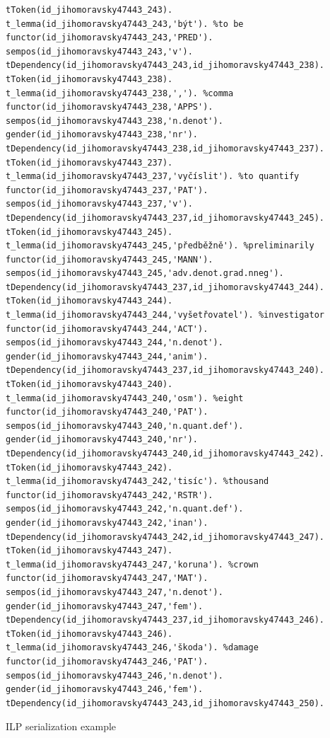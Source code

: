 \begin{listing}[ht]
\begin{verbatim}
tToken(id_jihomoravsky47443_243).
t_lemma(id_jihomoravsky47443_243,'být'). %to be
functor(id_jihomoravsky47443_243,'PRED').
sempos(id_jihomoravsky47443_243,'v').
tDependency(id_jihomoravsky47443_243,id_jihomoravsky47443_238).
tToken(id_jihomoravsky47443_238).
t_lemma(id_jihomoravsky47443_238,','). %comma
functor(id_jihomoravsky47443_238,'APPS').
sempos(id_jihomoravsky47443_238,'n.denot').
gender(id_jihomoravsky47443_238,'nr').
tDependency(id_jihomoravsky47443_238,id_jihomoravsky47443_237).
tToken(id_jihomoravsky47443_237).
t_lemma(id_jihomoravsky47443_237,'vyčíslit'). %to quantify
functor(id_jihomoravsky47443_237,'PAT').
sempos(id_jihomoravsky47443_237,'v').
tDependency(id_jihomoravsky47443_237,id_jihomoravsky47443_245).
tToken(id_jihomoravsky47443_245).
t_lemma(id_jihomoravsky47443_245,'předběžně'). %preliminarily
functor(id_jihomoravsky47443_245,'MANN').
sempos(id_jihomoravsky47443_245,'adv.denot.grad.nneg').
tDependency(id_jihomoravsky47443_237,id_jihomoravsky47443_244).
tToken(id_jihomoravsky47443_244).
t_lemma(id_jihomoravsky47443_244,'vyšetřovatel'). %investigator
functor(id_jihomoravsky47443_244,'ACT').
sempos(id_jihomoravsky47443_244,'n.denot').
gender(id_jihomoravsky47443_244,'anim').
tDependency(id_jihomoravsky47443_237,id_jihomoravsky47443_240).
tToken(id_jihomoravsky47443_240).
t_lemma(id_jihomoravsky47443_240,'osm'). %eight
functor(id_jihomoravsky47443_240,'PAT').
sempos(id_jihomoravsky47443_240,'n.quant.def').
gender(id_jihomoravsky47443_240,'nr').
tDependency(id_jihomoravsky47443_240,id_jihomoravsky47443_242).
tToken(id_jihomoravsky47443_242).
t_lemma(id_jihomoravsky47443_242,'tisíc'). %thousand
functor(id_jihomoravsky47443_242,'RSTR').
sempos(id_jihomoravsky47443_242,'n.quant.def').
gender(id_jihomoravsky47443_242,'inan').
tDependency(id_jihomoravsky47443_242,id_jihomoravsky47443_247).
tToken(id_jihomoravsky47443_247).
t_lemma(id_jihomoravsky47443_247,'koruna'). %crown
functor(id_jihomoravsky47443_247,'MAT').
sempos(id_jihomoravsky47443_247,'n.denot').
gender(id_jihomoravsky47443_247,'fem').
tDependency(id_jihomoravsky47443_237,id_jihomoravsky47443_246).
tToken(id_jihomoravsky47443_246).
t_lemma(id_jihomoravsky47443_246,'škoda'). %damage
functor(id_jihomoravsky47443_246,'PAT').
sempos(id_jihomoravsky47443_246,'n.denot').
gender(id_jihomoravsky47443_246,'fem').
tDependency(id_jihomoravsky47443_243,id_jihomoravsky47443_250).
\end{verbatim}
\caption{ILP serialization example}
\label{lst:ilp_serialization}
\end{listing}



